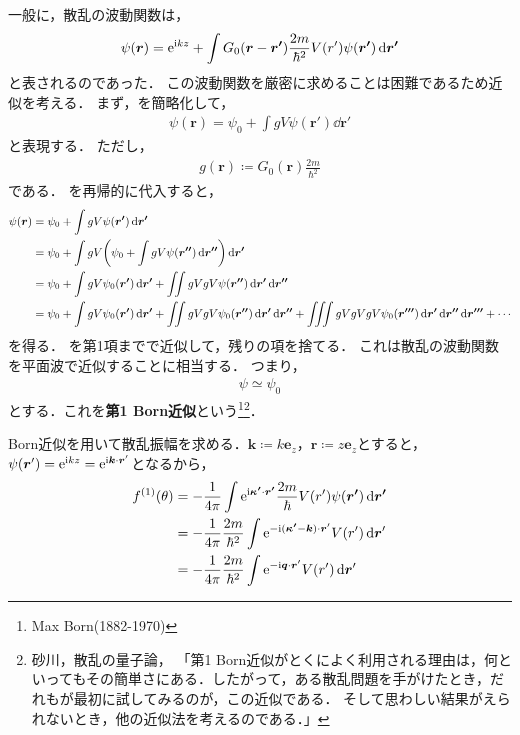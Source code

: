 \documentclass{report}
\begin{document}
  一般に，散乱の波動関数は，
  \begin{align}
    \psi(\bm{r}) = \mathrm{e}^{\mathrm{i} kz} + \int G_0 (\bm{r} - \bm{r'}) \frac{2m}{\hbar^2} V(r') \psi(\bm{r'}) \dd{\bm{r'}}\label{wave-funtion-of-scattering}
  \end{align}
  と表されるのであった．
  この波動関数を厳密に求めることは困難であるため近似を考える．
  まず，を簡略化して，
  \begin{align}
    \psi(\bm{r}) = \psi_0 + \int g V \psi(\bm{r}') \dd{\bm{r}'}\label{simple-wave-funtion-of-scattering}
  \end{align}
  と表現する．
  ただし，
  \begin{align}
    g(\bm{r}) \coloneqq G_0(\bm{r})\frac{2m}{\hbar^2}
  \end{align}
  である．
  を再帰的に代入すると，
  \begin{align}
    \psi(\bm{r}) &= \psi_0 + \int g V \psi(\bm{r'}) \dd{\bm{r'}} \\
    &= \psi_0 + \int gV \qty(\psi_0 + \int g V \psi(\bm{r''}) \dd{\bm{r''}}) \dd{\bm{r'}} \\
    &= \psi_0 + \int g V \psi_0(\bm{r'}) \dd{\bm{r'}} + \iint gVgV \psi(\bm{r''}) \dd{\bm{r'}} \dd{\bm{r''}} \\
    &= \psi_0 + \int g V \psi_0(\bm{r'}) \dd{\bm{r'}} + \iint gVgV \psi_0(\bm{r''}) \dd{\bm{r'}} \dd{\bm{r''}} + \iiint gVgVgV \psi_0(\bm{r'''}) \dd{\bm{r'}} \dd{\bm{r''}} \dd{\bm{r'''}} + \cdots\label{dozens-of-gv}
  \end{align}
  を得る．
  を第1項までで近似して，残りの項を捨てる．
  これは散乱の波動関数を平面波で近似することに相当する．
  つまり，
  \begin{align}
    \psi \simeq \psi_0
  \end{align}
  とする．これを\textbf{第1 Born近似}という\footnote{Max Born(1882-1970)}\footnote{砂川，散乱の量子論，
  「第1 Born近似がとくによく利用される理由は，何といってもその簡単さにある．したがって，ある散乱問題を手がけたとき，だれもが最初に試してみるのが，この近似である．
  そして思わしい結果がえられないとき，他の近似法を考えるのである．」}．
  \par
  Born近似を用いて散乱振幅を求める．$\bm{k} \coloneqq k\bm{e}_z$，$\bm{r} \coloneqq z\bm{e}_z$とすると，
  $\psi(\bm{r}') = \mathrm{e}^{\mathrm{i} kz} = \mathrm{e}^{\mathrm{i} \bm{k}\cdot\bm{r}'}$となるから，
  \begin{align}
    f^{(1)}(\theta) &= -\frac{1}{4\pi} \int \mathrm{e}^{\mathrm{i} \bm{\kappa'}\cdot\bm{r'}} \frac{2m}{\hbar} V(r') \psi(\bm{r'}) \dd{\bm{r'}} \\
    &= -\frac{1}{4\pi}\frac{2m}{\hbar^2}\int\mathrm{e}^{-\mathrm{i} (\bm{\kappa'} - \bm{k})\cdot\bm{r}'} V(r') \dd{\bm{r}'} \\
    &= -\frac{1}{4\pi}\frac{2m}{\hbar^2}\int\mathrm{e}^{-\mathrm{i} \bm{q}\cdot \bm{r}'} V(r') \dd{\bm{r}'}\label{potential-fourier-transform}
  \end{align}
\end{document}
